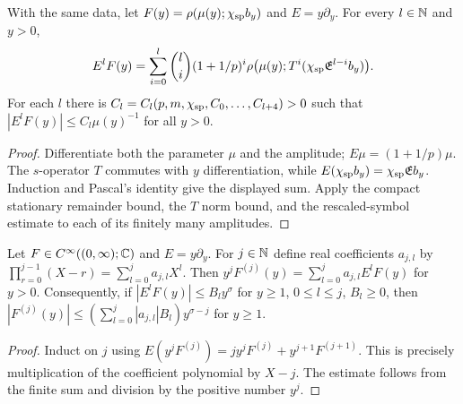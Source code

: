 \begin{lemma}
  \label{lem:c03_sp_near_euler_recurrence}
  With the same data, let $F(y)=\rho(\mu(y);\chi_{\rm sp}b_y)$ and $E=y\partial_y$.
  For every $l\in\mathbb{N}$ and $y>0$,
  \[
    E^lF(y)=\sum_{i=0}^l\binom li(1+1/p)^i
      \rho\bigl(\mu(y);T^i(\chi_{\rm sp}\mathfrak E^{l-i}b_y)\bigr).
  \]
  For each $l$ there is $C_l=C_l(p,m,\chi_{\rm sp},C_0,\ldots,C_{l+4})>0$
  such that $|E^lF(y)|\le C_l\mu(y)^{-1}$ for all $y>0$.
\end{lemma}
\begin{proof}
  Differentiate both the parameter $\mu$ and the amplitude; $E\mu=(1+1/p)\mu$.
  The $s$-operator $T$ commutes with $y$ differentiation, while $E(\chi_{\rm sp}b_y)=\chi_{\rm sp}\mathfrak E b_y$.
  Induction and Pascal's identity give the displayed sum. Apply the compact stationary remainder bound,
  the $T$ norm bound, and the rescaled-symbol estimate to each of its finitely many amplitudes.
\end{proof}

\begin{lemma}
  \label{lem:c03_euler_to_deriv}
  Let $F\in C^\infty((0,\infty);\mathbb{C})$ and $E=y\partial_y$.
  For $j\in\mathbb{N}$ define real coefficients $a_{j,l}$ by
  $\prod_{r=0}^{j-1}(X-r)=\sum_{l=0}^j a_{j,l}X^l$.
  Then $y^j F^{(j)}(y)=\sum_{l=0}^j a_{j,l}E^lF(y)$ for $y>0$.
  Consequently, if $|E^lF(y)|\le B_l y^\sigma$ for $y\ge1$, $0\le l\le j$, $B_l\ge0$,
  then $|F^{(j)}(y)|\le(\sum_{l=0}^j|a_{j,l}|B_l)y^{\sigma-j}$ for $y\ge1$.
\end{lemma}
\begin{proof}
  Induct on $j$ using $E(y^jF^{(j)})=j y^jF^{(j)}+y^{j+1}F^{(j+1)}$.
  This is precisely multiplication of the coefficient polynomial by $X-j$.
  The estimate follows from the finite sum and division by the positive number $y^j$.
\end{proof}

